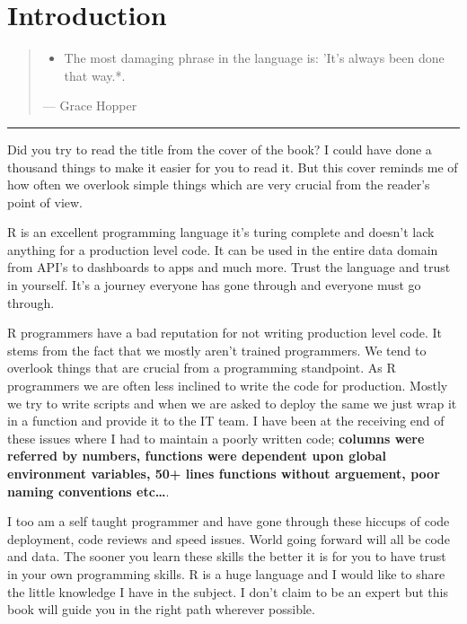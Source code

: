 \documentclass[
]{book}
\providecommand{\tightlist}{%
  \setlength{\itemsep}{0pt}\setlength{\parskip}{0pt}}
\begin{document}
\hypertarget{intro}{%
\chapter{Introduction}\label{intro}}

\begin{quote}
\begin{itemize}
\tightlist
\item
  The most damaging phrase in the language is: 'It's always been done that way.*.
\end{itemize}

--- Grace Hopper
\end{quote}

\begin{center}\rule{0.5\linewidth}{0.5pt}\end{center}

Did you try to read the title from the cover of the book? I could have done a thousand things to make it easier for you to read it. But this cover reminds me of how often we overlook simple things which are very crucial from the reader's point of view.

R is an excellent programming language it's turing complete and doesn't lack anything for a production level code. It can be used in the entire data domain from API's to dashboards to apps and much more. Trust the language and trust in yourself. It's a journey everyone has gone through and everyone must go through.

R programmers have a bad reputation for not writing production level code. It stems from the fact that we mostly aren't trained programmers. We tend to overlook things that are crucial from a programming standpoint. As R programmers we are often less inclined to write the code for production. Mostly we try to write scripts and when we are asked to deploy the same we just wrap it in a function and provide it to the IT team. I have been at the receiving end of these issues where I had to maintain a poorly written code; \textbf{columns were referred by numbers, functions were dependent upon global environment variables, 50+ lines functions without arguement, poor naming conventions etc\ldots{}}.

I too am a self taught programmer and have gone through these hiccups of code deployment, code reviews and speed issues. World going forward will all be code and data. The sooner you learn these skills the better it is for you to have trust in your own programming skills. R is a huge language and I would like to share the little knowledge I have in the subject. I don't claim to be an expert but this book will guide you in the right path wherever possible.
\end{document}
